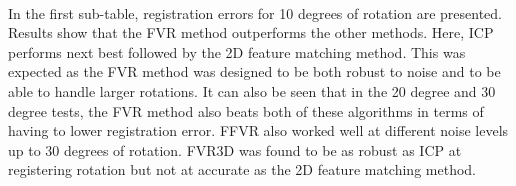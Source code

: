 \begin{table}[!htb]
\centering
{}
\\
\caption{Rotation Tracking}
\label{table:rote}
\end{table}

In the first sub-table, registration errors for 10 degrees of rotation are presented. Results show that the FVR method outperforms the other methods. Here, ICP performs next best followed by the 2D feature matching method. This was expected as the FVR method was designed to be both robust to noise and to be able to handle larger rotations. It can also be seen that in the 20 degree and 30 degree tests, the FVR method also beats both of these algorithms in terms of having to lower registration error. FFVR also worked well at different noise levels up to 30 degrees of rotation. FVR3D was found to be as robust as ICP at registering rotation but not at accurate as the 2D feature matching method. \\ 

